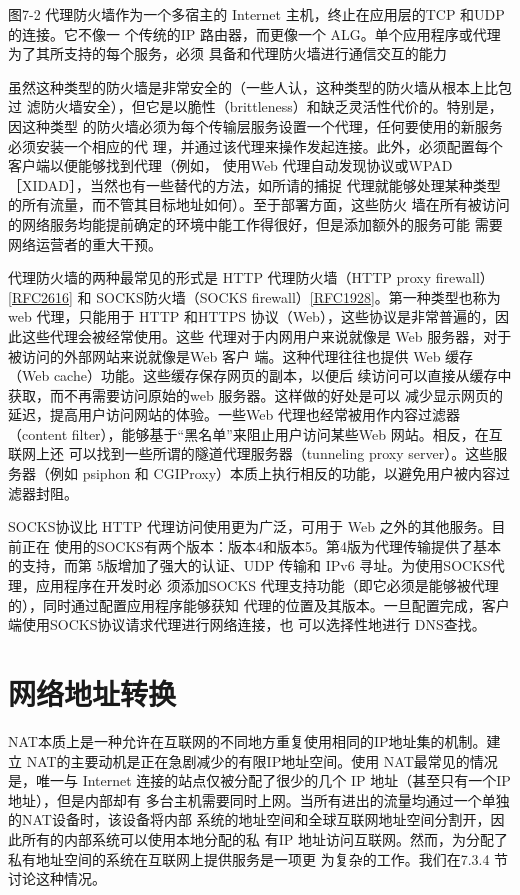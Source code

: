 图7-2 代理防火墙作为一个多宿主的 Internet 主机，终止在应用层的TCP 和UDP 的连接。它不像一
个传统的IP 路由器，而更像一个 ALG。单个应用程序或代理为了其所支持的每个服务，必须
具备和代理防火墙进行通信交互的能力

虽然这种类型的防火墙是非常安全的（一些人认，这种类型的防火墙从根本上比包过
滤防火墙安全），但它是以脆性（brittleness）和缺乏灵活性代价的。特别是，因这种类型
的防火墙必须为每个传输层服务设置一个代理，任何要使用的新服务必须安装一个相应的代
理，并通过该代理来操作发起连接。此外，必须配置每个客户端以便能够找到代理（例如，
使用Web 代理自动发现协议或WPAD［XIDAD］，当然也有一些替代的方法，如所请的捕捉
代理就能够处理某种类型的所有流量，而不管其目标地址如何）。至于部署方面，这些防火
墙在所有被访问的网络服务均能提前确定的环境中能工作得很好，但是添加额外的服务可能
需要网络运营者的重大干预。

代理防火墙的两种最常见的形式是 HTTP 代理防火墙（HTTP proxy firewall）
\href{https://www.rfc-editor.org/rfc/rfc2616}{[RFC2616]}
和 SOCKS防火墙（SOCKS
firewall）\href{https://www.rfc-editor.org/rfc/rfc1928}{[RFC1928]}。第一种类型也称为
web 代理，只能用于
HTTP 和HTTPS 协议（Web），这些协议是非常普遍的，因此这些代理会被经常使用。这些
代理对于内网用户来说就像是 Web 服务器，对于被访问的外部网站来说就像是Web 客户
端。这种代理往往也提供 Web 缓存（Web cache）功能。这些缓存保存网页的副本，以便后
续访问可以直接从缓存中获取，而不再需要访问原始的web 服务器。这样做的好处是可以
减少显示网页的延迟，提高用户访问网站的体验。一些Web 代理也经常被用作内容过滤器
（content filter），能够基于“黑名单”来阻止用户访问某些Web 网站。相反，在互联网上还
可以找到一些所谓的隧道代理服务器（tunneling proxy server）。这些服务器（例如 psiphon 和
CGIProxy）本质上执行相反的功能，以避免用户被内容过滤器封阻。

SOCKS协议比 HTTP 代理访问使用更为广泛，可用于 Web 之外的其他服务。目前正在
使用的SOCKS有两个版本：版本4和版本5。第4版为代理传输提供了基本的支持，而第
5版增加了强大的认证、UDP 传输和 IPv6 寻址。为使用SOCKS代理，应用程序在开发时必
须添加SOCKS 代理支持功能（即它必须是能够被代理的），同时通过配置应用程序能够获知
代理的位置及其版本。一旦配置完成，客户端使用SOCKS协议请求代理进行网络连接，也
可以选择性地进行 DNS查找。

\section{网络地址转换}

NAT本质上是一种允许在互联网的不同地方重复使用相同的IP地址集的机制。建立
NAT的主要动机是正在急剧减少的有限IP地址空间。使用 NAT最常见的情况是，唯一与
Internet 连接的站点仅被分配了很少的几个 IP 地址（甚至只有一个IP地址），但是内部却有
多台主机需要同时上网。当所有进出的流量均通过一个单独的NAT设备时，该设备将内部
系统的地址空间和全球互联网地址空间分割开，因此所有的内部系统可以使用本地分配的私
有IP 地址访问互联网。然而，为分配了私有地址空间的系统在互联网上提供服务是一项更
为复杂的工作。我们在7.3.4 节讨论这种情况。

